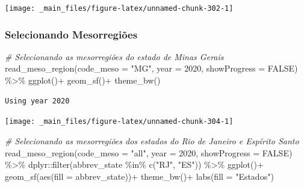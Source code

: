 \documentclass[
  brazilian,
]{book}
\newenvironment{Shaded}{\begin{snugshade}}{\end{snugshade}}
\newcommand{\AttributeTok}[1]{\textcolor[rgb]{0.77,0.63,0.00}{#1}}
\newcommand{\CommentTok}[1]{\textcolor[rgb]{0.56,0.35,0.01}{\textit{#1}}}
\newcommand{\ConstantTok}[1]{\textcolor[rgb]{0.00,0.00,0.00}{#1}}
\newcommand{\DecValTok}[1]{\textcolor[rgb]{0.00,0.00,0.81}{#1}}
\newcommand{\FunctionTok}[1]{\textcolor[rgb]{0.00,0.00,0.00}{#1}}
\newcommand{\NormalTok}[1]{#1}
\newcommand{\SpecialCharTok}[1]{\textcolor[rgb]{0.00,0.00,0.00}{#1}}
\newcommand{\StringTok}[1]{\textcolor[rgb]{0.31,0.60,0.02}{#1}}
\begin{document}
\begin{center}\texttt{[image: \_main\_files/figure-latex/unnamed-chunk-302-1]} \end{center}

\hypertarget{selecionando-mesorregiuxf5es}{%
\subsubsection{Selecionando Mesorregiões}\label{selecionando-mesorregiuxf5es}}

\begin{Shaded}
\begin{Highlighting}[]
\CommentTok{\# Selecionando as mesorregiões do estado de Minas Gerais}
\FunctionTok{read\_meso\_region}\NormalTok{(}\AttributeTok{code\_meso =} \StringTok{"MG"}\NormalTok{,}
                 \AttributeTok{year =} \DecValTok{2020}\NormalTok{,}
                 \AttributeTok{showProgress =} \ConstantTok{FALSE}\NormalTok{) }\SpecialCharTok{\%\textgreater{}\%}
  \FunctionTok{ggplot}\NormalTok{()}\SpecialCharTok{+}
  \FunctionTok{geom\_sf}\NormalTok{()}\SpecialCharTok{+}
  \FunctionTok{theme\_bw}\NormalTok{()}
\end{Highlighting}
\end{Shaded}

\begin{verbatim}
Using year 2020
\end{verbatim}

\begin{center}\texttt{[image: \_main\_files/figure-latex/unnamed-chunk-304-1]} \end{center}

\begin{Shaded}
\begin{Highlighting}[]
\CommentTok{\# Selecionando as mesorregiões dos estados do Rio de Janeiro e Espírito Santo}
\FunctionTok{read\_meso\_region}\NormalTok{(}\AttributeTok{code\_meso =} \StringTok{"all"}\NormalTok{,}
                 \AttributeTok{year =} \DecValTok{2020}\NormalTok{,}
                 \AttributeTok{showProgress =} \ConstantTok{FALSE}\NormalTok{) }\SpecialCharTok{\%\textgreater{}\%} 
\NormalTok{  dplyr}\SpecialCharTok{::}\FunctionTok{filter}\NormalTok{(abbrev\_state }\SpecialCharTok{\%in\%} \FunctionTok{c}\NormalTok{(}\StringTok{"RJ"}\NormalTok{, }\StringTok{"ES"}\NormalTok{)) }\SpecialCharTok{\%\textgreater{}\%} 
  \FunctionTok{ggplot}\NormalTok{()}\SpecialCharTok{+}
  \FunctionTok{geom\_sf}\NormalTok{(}\FunctionTok{aes}\NormalTok{(}\AttributeTok{fill =}\NormalTok{ abbrev\_state))}\SpecialCharTok{+}
  \FunctionTok{theme\_bw}\NormalTok{()}\SpecialCharTok{+}
  \FunctionTok{labs}\NormalTok{(}\AttributeTok{fill =} \StringTok{"Estados"}\NormalTok{)}
\end{Highlighting}
\end{Shaded}
\end{document}
